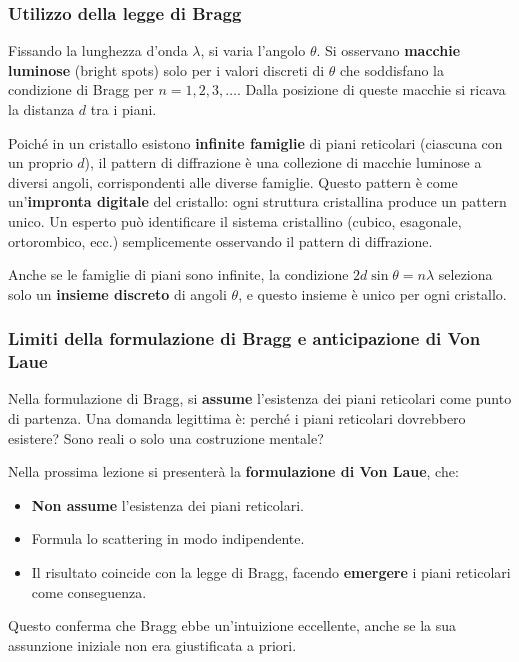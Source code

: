 \subsubsection{Utilizzo della legge di Bragg}

Fissando la lunghezza d'onda $\lambda$, si varia l'angolo $\theta$. Si osservano \textbf{macchie luminose} (bright spots) solo per i valori discreti di $\theta$ che soddisfano la condizione di Bragg per $n = 1, 2, 3, \ldots$. Dalla posizione di queste macchie si ricava la distanza $d$ tra i piani.

Poiché in un cristallo esistono \textbf{infinite famiglie} di piani reticolari (ciascuna con un proprio $d$), il pattern di diffrazione è una collezione di macchie luminose a diversi angoli, corrispondenti alle diverse famiglie. Questo pattern è come un'\textbf{impronta digitale} del cristallo: ogni struttura cristallina produce un pattern unico. Un esperto può identificare il sistema cristallino (cubico, esagonale, ortorombico, ecc.) semplicemente osservando il pattern di diffrazione.

\begin{nota}
Anche se le famiglie di piani sono infinite, la condizione $2d\sin\theta = n\lambda$ seleziona solo un \textbf{insieme discreto} di angoli $\theta$, e questo insieme è unico per ogni cristallo.
\end{nota}

\subsubsection{Limiti della formulazione di Bragg e anticipazione di Von Laue}

Nella formulazione di Bragg, si \textbf{assume} l'esistenza dei piani reticolari come punto di partenza. Una domanda legittima è: perché i piani reticolari dovrebbero esistere? Sono reali o solo una costruzione mentale?

Nella prossima lezione si presenterà la \textbf{formulazione di Von Laue}, che:
\begin{itemize}
    \item \textbf{Non assume} l'esistenza dei piani reticolari.
    \item Formula lo scattering in modo indipendente.
    \item Il risultato coincide con la legge di Bragg, facendo \textbf{emergere} i piani reticolari come conseguenza.
\end{itemize}

Questo conferma che Bragg ebbe un'intuizione eccellente, anche se la sua assunzione iniziale non era giustificata a priori.

